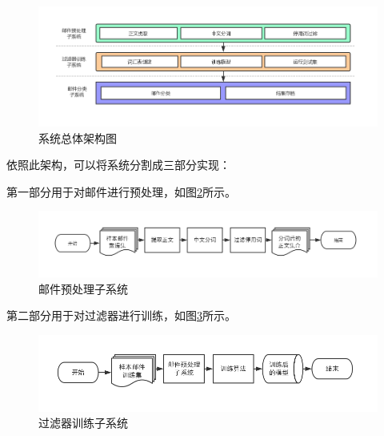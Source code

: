 \documentclass[UTF8,zihao=-4]{ctexart}
\begin{document}
	\begin{figure}[H]
		\centering
		\setlength{\abovecaptionskip}{0.cm}
		\setlength{\belowcaptionskip}{-0.cm}
		\includegraphics[scale=0.5]{pictures/系统总体架构图.png}
		\caption{系统总体架构图}
		\label{fig:overall-structure}
	\end{figure}

	依照此架构，可以将系统分割成三部分实现：
	
	第一部分用于对邮件进行预处理，如图\ref{fig:preprocess-system}所示。
	\begin{figure}[H]
		\centering
		\setlength{\abovecaptionskip}{0.cm}
		\setlength{\belowcaptionskip}{-0.cm}
		\includegraphics[scale=0.45]{pictures/邮件预处理子系统.png}
		\caption{邮件预处理子系统}
		\label{fig:preprocess-system}
	\end{figure}
	
	第二部分用于对过滤器进行训练，如图\ref{fig:train-system}所示。
	\begin{figure}[H]
		\centering
		\setlength{\abovecaptionskip}{0.cm}
		\setlength{\belowcaptionskip}{-0.cm}
		\includegraphics[scale=0.45]{pictures/邮件训练子系统.png}
		\caption{过滤器训练子系统}
		\label{fig:train-system}
	\end{figure}
		
\end{document}
